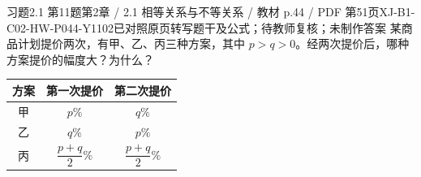 \par\noindent\begin{minipage}{\linewidth}
\begin{bankitem}{习题2.1 第11题}{第2章 / 2.1 相等关系与不等关系 / 教材 p.44 / PDF 第51页}{XJ-B1-C02-HW-P044-Y1102}{已对照原页转写题干及公式；待教师复核；未制作答案}
某商品计划提价两次，有甲、乙、丙三种方案，其中 $p>q>0$。经两次提价后，哪种方案提价的幅度大？为什么？
\begin{center}\begin{tabular}{c|c|c}\hline
方案&第一次提价&第二次提价\\\hline
甲&$p\%$&$q\%$\\
乙&$q\%$&$p\%$\\
丙&$\dfrac{p+q}{2}\%$&$\dfrac{p+q}{2}\%$\\\hline
\end{tabular}\end{center}
\end{bankitem}
\end{minipage}\par\medskip
